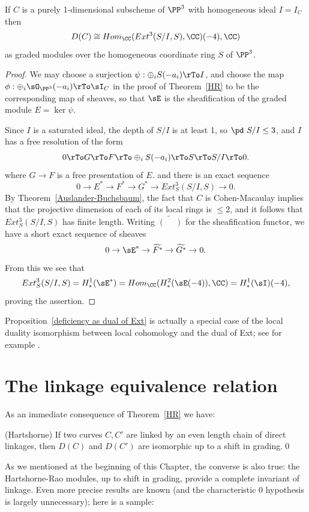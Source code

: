 \begin{proposition}\label{deficiency as dual of Ext}
If $C$ is a purely 1-dimensional subscheme of $\PP^3$ with homogeneous ideal $I = I_C$ then 
$$
D(C) \cong Hom_\CC (Ext^3(S/I, S), \CC)(-4), \CC)
$$
as graded modules over the homogeneous coordinate ring $S$ of $\PP^3$.
\end{proposition}

\begin{proof}
We may choose a surjection  $\psi:  \oplus_iS(-a_i)\rTo I$, and choose the map
$\phi: \oplus_i\sO_{\PP^3}(-a_i)\rTo\sI_C$
in the proof of Theorem~\ref{HR}
to be the corresponding map of sheaves, so that
$\sE$ is the sheafification of the graded module $E = \ker \psi$.

Since $I$ is a saturated ideal,
 the depth of $S/I$ is at least 1, so $\pd\ S/I\leq 3$, and $I$ has a free resolution of the form
$$
0\rTo G \rTo F \rTo \oplus_iS(-a_i)  \rTo S\rTo S/I \rTo 0.
$$
where $G\to F$ is a free presentation of $E$. and there is an exact sequence
$$
0 \to E^* \to F^* \to G^* \to Ext^3_S(S/I, S) \to 0.
$$
By Theorem~\ref{Auslander-Buchsbaum}, the fact that $C$ is Cohen-Macaulay implies that the projective dimension of each of its
local rings is $\leq 2$,  and it follows that
$Ext^3_S(S/I, S)$ has finite length. Writing $\widetilde{(\phantom{-})}$ for the sheafification functor,
we have a short exact sequence of sheaves 
$$
0\to \sE^* \to \widetilde{F^*} \to \widetilde{G^*}\to 0.
$$
From this we see that 
$$
Ext^3_S(S/I,S) = H^1_*(\sE^*) = Hom_\CC( H^2_*(\sE(-4)),\CC) = H^1_*(\sI)(-4),
$$
proving the assertion.
\end{proof}

Proposition~\ref{deficiency as dual of Ext} is actually a special case of the local duality isomorphism between local cohomology and the dual of Ext; see for example \cite[Theorem A.1.9]{MR2103875}.

\section{The linkage equivalence relation}
As an immediate consequence of Theorem~\ref{HR} we have:
\begin{corollary}(Hartshorne)
 If two curves $C,C'$ are linked by an even length chain of direct linkages, then 
 $D(C)$ and $D(C')$ are isomorphic up to a shift in grading.\qed
\end{corollary}

As we mentioned at the beginning of this Chapter, the converse is also true: the Hartshorne-Rao modules, up to shift in grading, provide a complete invariant of
linkage. Even more precise results are known (and the characteristic 0 hypothesis is largely unnecessary); here is a sample:

